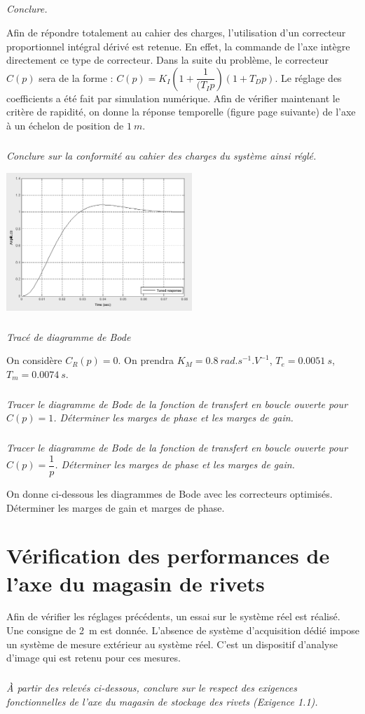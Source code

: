 \documentclass[10pt,fleqn]{article} %
\begin{document}
\begin{multicols}{2}
\subparagraph{}
\textit{Conclure.}

Afin de répondre totalement au cahier des charges, l'utilisation d'un correcteur proportionnel intégral dérivé est retenue. En effet, la commande de l'axe intègre directement ce type de correcteur. Dans la suite du problème, le correcteur $C(p)$ sera de la forme : $C(p)=K_I \left(1+\dfrac{1}{(T_I p}\right)\left(1+T_D p\right)$. Le réglage des coefficients a été fait par simulation numérique.
Afin de vérifier maintenant le critère de rapidité, on donne la réponse temporelle (figure page suivante) de l'axe à un échelon de position de $\SI{1}{m}$.

\subparagraph{}
\textit{Conclure sur la conformité au cahier des charges du système ainsi réglé.}
 
 \begin{center}
\includegraphics[width=7cm]{images/image11}
\end{center} 


 

\subparagraph{}
\textit{Tracé de diagramme de Bode}

On considère $C_R (p)=0$. On prendra $K_M=\SI{0,8}{rad.s^{-1}.V^{-1}}$, $T_e=\SI{0,0051}{s}$,$T_m=\SI{0,0074}{s}$.

\subparagraph{}
\textit{Tracer le diagramme de Bode de la fonction de transfert en boucle ouverte pour $C(p)=1$. Déterminer les marges de phase et les marges de gain.}
 
\subparagraph{}
\textit{Tracer le diagramme de Bode de la fonction de transfert en boucle ouverte pour $C(p)=\dfrac{1}{p}$. Déterminer les marges de phase et les marges de gain.}

On donne ci-dessous les diagrammes de Bode avec les correcteurs optimisés. Déterminer les marges de gain et marges de phase. 

\section*{Vérification des performances de l'axe du magasin de rivets}

Afin de vérifier les réglages précédents, un essai sur le système réel est réalisé. Une consigne de \SI{2}{m} est donnée. L'absence de système d'acquisition dédié impose un système de mesure extérieur au système réel. C'est un dispositif d'analyse d'image qui est retenu pour ces mesures.

\subparagraph{}
\textit{À partir des relevés ci-dessous, conclure sur le respect des exigences fonctionnelles de l'axe du magasin de stockage des rivets (Exigence 1.1).}

 
\end{multicols}
\end{document}
